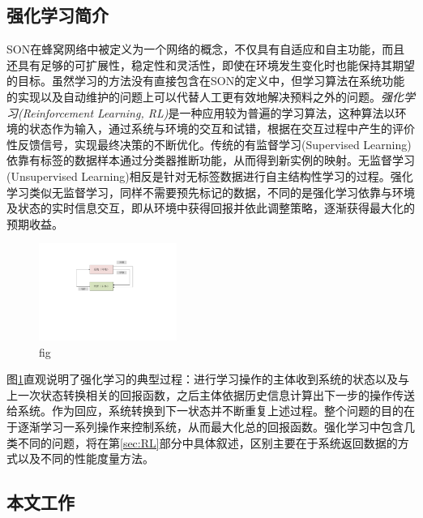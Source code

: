 \documentclass{IEEEtran}
\begin{document}
\subsection{强化学习简介}


SON在蜂窝网络中被定义为一个网络的概念，不仅具有自适应和自主功能，而且还具有足够的可扩展性，稳定性和灵活性，即使在环境发生变化时也能保持其期望的目标。虽然学习的方法没有直接包含在SON的定义中，但学习算法在系统功能的实现以及自动维护的问题上可以代替人工更有效地解决预料之外的问题。\emph{强化学习(Reinforcement Learning, RL)}是一种应用较为普遍的学习算法，这种算法以环境的状态作为输入，通过系统与环境的交互和试错，根据在交互过程中产生的评价性反馈信号，实现最终决策的不断优化。传统的有监督学习(Supervised Learning)依靠有标签的数据样本通过分类器推断功能，从而得到新实例的映射。无监督学习(Unsupervised Learning)相反是针对无标签数据进行自主结构性学习的过程。强化学习类似无监督学习，同样不需要预先标记的数据，不同的是强化学习依靠与环境及状态的实时信息交互，即从环境中获得回报并依此调整策略，逐渐获得最大化的预期收益。
\begin{figure}%
\centerline{\includegraphics[width=0.4\textwidth]{reinforcement.pdf}}
\caption{fig}
\label{fig:rein}
\end{figure}

图\ref{fig:rein}直观说明了强化学习的典型过程：进行学习操作的主体收到系统的状态以及与上一次状态转换相关的回报函数，之后主体依据历史信息计算出下一步的操作传送给系统。作为回应，系统转换到下一状态并不断重复上述过程。整个问题的目的在于逐渐学习一系列操作来控制系统，从而最大化总的回报函数。强化学习中包含几类不同的问题，将在第\ref{sec:RL}部分中具体叙述，区别主要在于系统返回数据的方式以及不同的性能度量方法。


\subsection{本文工作}
\end{document}
